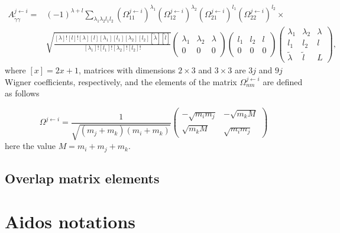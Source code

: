 \documentclass[12pt,a4paper,twoside]{article}
\begin{document}
 \begin{align}
A_{\tilde{\gamma}\gamma}^{j\leftarrow i}  = & (-1)^{\lambda+l}  \sum_{\lambda_1 \lambda_2 l_1 l_2} 
\left(\Omega_{11}^{j\leftarrow i} \right)^{\lambda_1} 
\left(\Omega_{12}^{j\leftarrow i} \right)^{\lambda_2} 
\left(\Omega_{21}^{j\leftarrow i} \right)^{l_1} 
\left(\Omega_{22}^{j\leftarrow i} \right)^{l_2} 
\times 
\\
& \sqrt{\frac{[\lambda]! [l]! [\lambda] [l] [\lambda_1] [l_1] [\lambda_2] [l_2] [\tilde{\lambda}] [\tilde{l}]}{[\lambda_1]! [l_1]! [\lambda_2]! [l_2]!}}  
  \begin{pmatrix}
 \lambda_1 & \lambda_2 & \lambda \\ 
 0 & 0 & 0
 \end{pmatrix} 
  \begin{pmatrix}
 l_1 & l_2 & l \\ 
 0 & 0 & 0
 \end{pmatrix} 
 \begin{pmatrix}
 \lambda_1 & \lambda_2 & \lambda \\ 
 l_1 & l_2 & l \\
 \tilde{\lambda} & \tilde{l} & L
 \end{pmatrix},  \nonumber 
\end{align}
where $ \left [x \right] = 2x + 1 $, matrices with dimensions $ 2 \times3 $ and $ 3 \times3 $ are $ 3j $ and $ 9j $ Wigner coefficients, respectively, and the elements of the matrix $ \Omega^{j \leftarrow i}_{nm} $ are defined as follows

\begin{equation*}
 \Omega^{j \leftarrow i} = \frac{1}{\sqrt{\left( m_j + m_k \right)\left( m_i + m_k \right)}}
 \begin{pmatrix}
 -\sqrt{m_i m_j} & -\sqrt{m_k M} \\
 \sqrt{m_k M}  &  \sqrt{m_i m_j}
 \end{pmatrix}
 \end{equation*}
  here the value $ M = m_i + m_j + m_k $.


\subsection*{Overlap matrix elements}



\section{Aidos notations}
\end{document}
